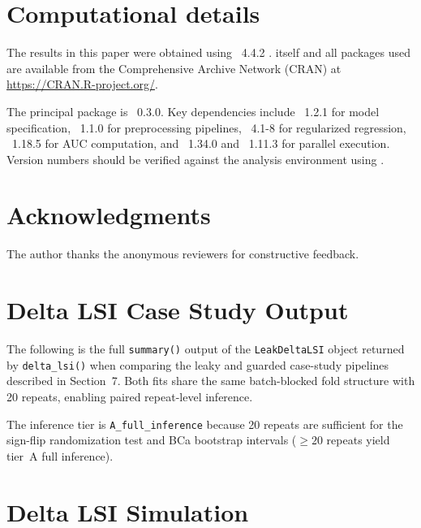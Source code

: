 \documentclass[article]{jss}
\begin{document}
\section*{Computational details}

The results in this paper were obtained using
~4.4.2 \citep{R2024}.  itself
and all packages used are available from the Comprehensive
 Archive Network (CRAN) at
\url{https://CRAN.R-project.org/}.

The principal package is ~0.3.0. Key dependencies include
~1.2.1 for model specification,
~1.1.0 for preprocessing pipelines,
~4.1-8 for regularized regression,
~1.18.5 for AUC computation,
and ~1.34.0 and ~1.11.3 for parallel
execution. Version numbers should be verified against the analysis
environment using .

\section*{Acknowledgments}

The author thanks the anonymous reviewers for constructive feedback.





\appendix
\newpage

\section[Delta LSI Case Study Output]{Delta LSI Case Study Output}
\label{app:delta-lsi}

The following is the full \texttt{summary()} output of the
\texttt{LeakDeltaLSI} object returned by \texttt{delta\_lsi()} when comparing
the leaky and guarded case-study pipelines described in Section~7. Both fits
share the same batch-blocked fold structure with 20 repeats, enabling paired
repeat-level inference.



\noindent
The inference tier is \texttt{A\_full\_inference} because 20 repeats are
sufficient for the sign-flip randomization test and BCa bootstrap intervals
($\geq 20$ repeats yield tier~A full inference).

\section[Delta LSI Simulation]{Delta LSI Simulation}
\label{app:delta-lsi-sim}
\end{document}
